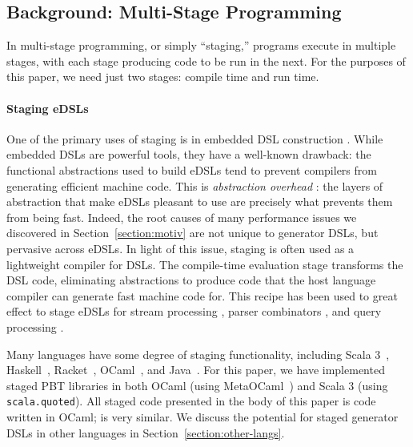 \documentclass[acmsmall]{acmart}
\theoremstyle{definition}
\begin{document}
\subsection{Background: Multi-Stage Programming}
\label{subsection:msp}

In multi-stage programming, or simply ``staging,'' programs execute
in multiple stages, with each stage producing code to be run
in the next. For the purposes of this paper, we need just two stages: compile time and run time.

\paragraph{Staging eDSLs}
One of the primary uses of staging is in embedded DSL construction \cite{sheard99, lms, trattdsl}.
While embedded DSLs are powerful tools, they have a well-known drawback:
the functional abstractions used to build eDSLs tend to prevent compilers from generating efficient machine code.
This is \emph{abstraction overhead} \cite{carrette05, moller20}: the layers of abstraction that
make eDSLs pleasant to use are precisely what prevents them from being fast.
Indeed, the root causes of many performance issues we discovered in Section~\ref{section:motiv} are
not unique to generator DSLs, but pervasive across eDSLs.
In light of this issue, staging is often used as a lightweight compiler for DSLs. The compile-time evaluation stage
transforms the DSL code, eliminating abstractions to produce code that the host language compiler can generate fast machine code for.
This recipe has been used to great effect to stage eDSLs for stream processing \cite{moller20,strymonas}, parser combinators \cite{sspc, staged-parsers, krishnaswami19, flap},
and query processing \cite{rhyme}.

Many languages have some degree of staging functionality, including
Scala 3~\cite{scalamacros}, Haskell~\cite{templatehaskell}, Racket~\cite{flatt12}, OCaml~\cite{metaocaml,macocaml}, and Java~\cite{mint}.
For this paper, we have implemented staged PBT libraries in both OCaml (using MetaOCaml~\cite{metaocaml}) and Scala 3 (using
\texttt{scala.quoted}). All staged code presented in the body of this paper is \camlname{} code written in OCaml;
\scalaname{} is very similar.
We discuss the potential for staged generator DSLs in other languages in Section~\ref{section:other-langs}.
\end{document}

